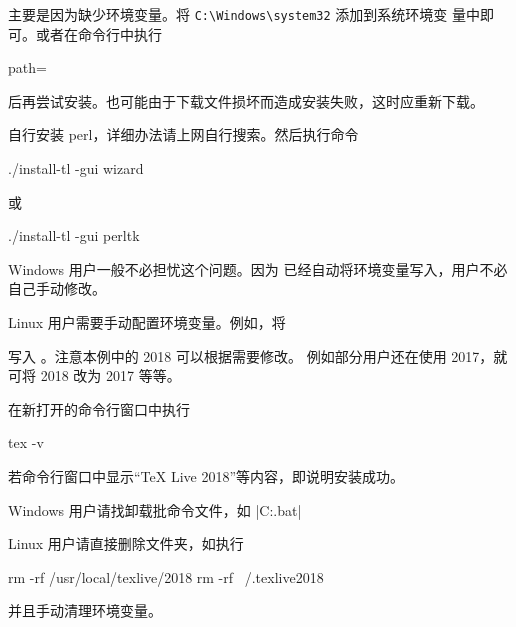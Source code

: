 
主要是因为缺少环境变量。将 \verb|C:\Windows\system32| 添加到系统环境变
量中即可。或者在命令行中执行
\begin{shcode}
path=%
\end{shcode}
后再尝试安装。也可能由于下载文件损坏而造成安装失败，这时应重新下载。



自行安装 perl，详细办法请上网自行搜索。然后执行命令
\begin{shcode}
./install-tl -gui wizard
\end{shcode}
或
\begin{shcode}
./install-tl -gui perltk
\end{shcode}



Windows 用户一般不必担忧这个问题。因为 \TeXLive{} 已经自动将环境变量写入，用户不必自己手动修改。

Linux 用户需要手动配置环境变量。例如，将

写入 。注意本例中的 2018 可以根据需要修改。
例如部分用户还在使用 \TeXLive{} 2017，就可将 2018 改为 2017 等等。



在新打开的命令行窗口中执行
\begin{shcode}
tex -v
\end{shcode}
若命令行窗口中显示“TeX Live 2018”等内容，即说明安装成功。



Windows 用户请找卸载批命令文件，如 |C:\texlive{}\tlpkg\installer\uninst.bat|

Linux 用户请直接删除文件夹，如执行
\begin{shcode}
  rm -rf /usr/local/texlive/2018
  rm -rf ~/.texlive2018
\end{shcode}
并且手动清理环境变量。


